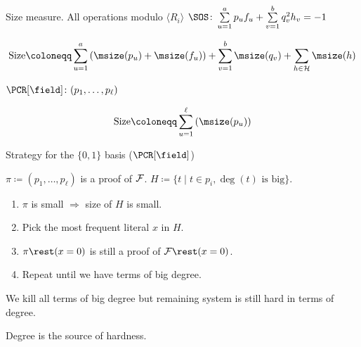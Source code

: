 \begin{frame}{Size measure. All operations modulo $\langle R_i \rangle$}
    \pause
    $\SOS\colon \sum\limits_{u = 1}^{a} p_u f_u + \sum\limits_{v = 1}^{b} q_v^2 h_v = -1$

    $$
    \text{Size} \coloneqq \sum_{u = 1}^{a} \left( \msize(p_u) + \msize(f_u) \right) +
    \sum_{v = 1}^{b} \msize(q_v) + \sum_{h \in \Hs} \msize(h)
    $$
        
    \vspace{1cm}
    $\PCR[\field]\colon (p_1, \dots, p_{\ell})$
    
    $$
    \text{Size} \coloneqq \sum_{u = 1}^{\ell} \left( \msize(p_u) \right)
    $$
\end{frame}


\begin{frame}{Strategy for the $\{0, 1\}$ basis ($\PCR[\field]$)}
    
    $\pi \coloneqq (p_1, \dots, p_{\ell})$ is a proof of $\mathcal{F}$. $H \coloneqq \{t \mid t \in p_i, \deg(t)
    \text{ is big}\}$.

    \begin{enumerate}
        \item $\pi$ is small $\Rightarrow$ size of $H$ is small.
        \pause
        \item Pick the most frequent literal $x$ in $H$.
        \pause
        \pause
        \item $\pi \rest (x = 0)$ is still a proof of $\Fs \rest (x = 0)$.
        \pause
        \pause
        \pause    
        \item Repeat until we have terms of big degree.
    \end{enumerate}

    \vspace{0.3cm}
    \pause
    We kill all terms of big degree but remaining system is still hard in terms of degree.

    \vspace{0.3cm}
    \pause
    \begin{center}
        \Huge Degree is the source of hardness.
    \end{center}
\end{frame}


